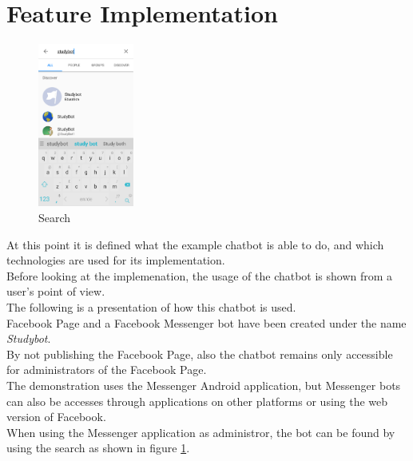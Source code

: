 \section{Feature Implementation}
\label{implementation}


\begin{figure}
  \centering
  \includegraphics[width=0.28\textwidth]{images/interface/01-search.png}
	\caption{Search}
	\label{fig:01-search}
\end{figure}

At this point it is defined what the example chatbot is able to do,
and which technologies are used for its implementation.
\\

Before looking at the implemenation,
the usage of the chatbot is shown from a user's point of view.
\\
The following is a presentation of how this chatbot is used.
\\

Facebook Page and a Facebook Messenger bot have been created under the name \emph{Studybot}.
\\
By not publishing the Facebook Page, also the chatbot remains only accessible for administrators of the Facebook Page.
\\

The demonstration uses the Messenger Android application,
but Messenger bots can also be accesses through applications on other platforms
or using the web version of Facebook.
\\

When using the Messenger application as administror,
the bot can be found by using the search as shown in figure \ref{fig:01-search}.
\\

